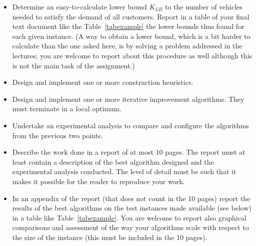 \begin{itemize}

\item Determine an easy-to-calculate lower bound $K_{LB}$ to the number
  of vehicles needed to satisfy the demand of all customers.  Report in
  a table of your final text document like the Table~\ref{tabexample}
  the lower bounds thus found for each given instance. (A way to obtain
  a lower bound, which is a bit harder to calculate than the one asked
  here, is by solving a problem addressed in the lectures; you are
  welcome to report about this procedure as well although this is not
  the main task of the assignment.)



\item Design and implement one or more construction heuristics.

\item Design and implement one or more iterative improvement
  algorithms. They must terminate in a local optimum.

\item Undertake an experimental analysis to compare and
  configure the algorithms from the previous two points. 

\item Describe the work done in a report of at most 10 pages. The report
  must at least contain a description of the best algorithm designed and
  the experimental analysis conducted. The level of detail must be such
  that it makes it possible for the reader to reproduce your work.



\item In an appendix of the report (that does not count in the 10 pages)
  report the results of the best algorithms on the test instances
  made available (see below) in a table like Table~\ref{tabexample}. You
  are welcome to report also graphical comparisons and assessment of the
  way your algorithms scale with respect to the size of the instance
  (this must be included in the 10 pages).  





\end{itemize}
